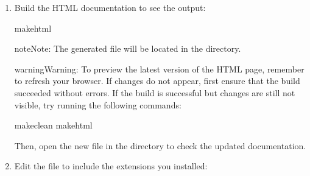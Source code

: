 \documentclass[a4paper,10pt,english]{sphinxmanual}
\begin{document}
\begin{enumerate}
\item {} 
\sphinxAtStartPar
{}

\sphinxAtStartPar
Build the HTML documentation to see the output:

\begin{sphinxVerbatim}[commandchars=\\\{\}]
makehtml
\end{sphinxVerbatim}

\begin{sphinxadmonition}{note}{Note:}
\sphinxAtStartPar
The generated  file will be located in the  directory.
\end{sphinxadmonition}

\begin{sphinxadmonition}{warning}{Warning:}
\sphinxAtStartPar
To preview the latest version of the HTML page, remember to refresh your browser. If changes do not appear, first ensure that the build succeeded without errors. If the build is successful but changes are still not visible, try running the following commands:

\begin{sphinxVerbatim}[commandchars=\\\{\}]
makeclean
makehtml
\end{sphinxVerbatim}

\sphinxAtStartPar
Then, open the new  file in the  directory to check the updated documentation.
\end{sphinxadmonition}

\item {} 
\sphinxAtStartPar
{}

\sphinxAtStartPar
Edit the  file to include the extensions you installed:

\begin{sphinxVerbatim}[commandchars=\\\{\}]
  \PYG{p}{[}    \PYG{p}{]}
\end{sphinxVerbatim}


\end{enumerate}
\end{document}
